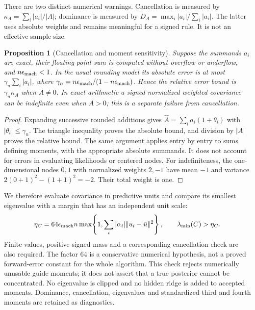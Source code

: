 \documentclass[11pt]{article}
\newtheorem{proposition}{Proposition}
\begin{document}
There are two distinct numerical warnings. Cancellation is measured by
$\kappa_A=\sum_i|a_i|/|A|$; dominance is measured by
$D_A=\max_i|a_i|/\sum_i|a_i|$. The latter uses absolute weights and
remains meaningful for a signed rule. It is not an effective sample size.

\begin{proposition}[Cancellation and moment sensitivity]
\label{prop:robust-cancellation}
Suppose the summands $a_i$ are exact, their floating-point sum is computed
without overflow or underflow, and $n\epsilon_{\rm mach}<1$. In the
usual rounding model its absolute error is at most
$\gamma_n\sum_i|a_i|$, where
$\gamma_n=n\epsilon_{\rm mach}/(1-n\epsilon_{\rm mach})$.
Hence the relative error bound is $\gamma_n\kappa_A$ when $A\ne0$.
In exact arithmetic a signed normalized weighted covariance can be
indefinite even when $A>0$; this is a separate failure from cancellation.
\end{proposition}
\begin{proof}
Expanding successive rounded additions gives
$\widehat A=\sum_i a_i(1+\theta_i)$ with
$|\theta_i|\le\gamma_n$. The triangle inequality proves the absolute
bound, and division by $|A|$ proves the relative bound. The same argument
applies entry by entry to sums defining moments, with the appropriate
absolute summands. It does not account for errors in evaluating likelihoods
or centered nodes. For indefiniteness, the one-dimensional nodes $0,1$
with normalized weights $2,-1$ have mean $-1$ and variance
$2(0+1)^2-(1+1)^2=-2$. Their total weight is one.
\end{proof}

We therefore evaluate covariance in predictive units and compare its
smallest eigenvalue with a margin that has an independent unit scale:
\begin{equation}
 \eta_C=64\epsilon_{\rm mach} n
 \max\!\left\{1,\sum_i |\alpha_i|\|u_i-\bar u\|^2\right\},
 \qquad \lambda_{\min}(C)>\eta_C .
 \label{eq:robust-margin}
\end{equation}
Finite values, positive signed mass and a corresponding cancellation check
are also required. The factor 64 is a conservative numerical hypothesis,
not a proved forward-error constant for the whole algorithm. This check
rejects numerically unusable guide moments; it does not assert that a true
posterior cannot be concentrated. No eigenvalue is clipped and no hidden
ridge is added to accepted moments. Dominance, cancellation, eigenvalues
and standardized third and fourth moments are retained as diagnostics.
\end{document}
